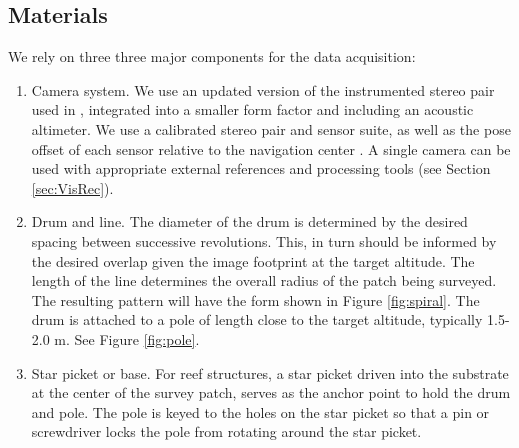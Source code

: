 
\subsection{Materials}
We rely on three three major components for the data acquisition:
\begin{enumerate}
\item Camera system. We use an updated version of the instrumented stereo pair used in \cite{Henderson_2013} \cite{Camilli_2007}, integrated into a smaller form factor and including an acoustic altimeter. We use a calibrated stereo pair and sensor suite, as well as the pose offset of each sensor relative to the navigation center \cite{Johnson_Roberson_2013} \cite{Mahon_2008}. A single camera can be used with appropriate external references and processing tools (see Section \ref{sec:VisRec}).
\item Drum and line. The diameter of the drum is determined by the desired spacing between successive revolutions. This, in turn should be informed by the desired overlap given the image footprint at the target altitude. The length of the line determines the overall radius of the patch being surveyed. The resulting pattern will have the form shown in Figure \ref{fig:spiral}. The drum is attached to a pole of length close to the target altitude, typically 1.5-2.0 m. See Figure \ref{fig:pole}.




\item Star picket or base. For reef structures, a star picket driven into the substrate at the center of the survey patch, serves as the anchor point to hold the drum and pole. The pole is keyed to the holes on the star picket so that a pin or screwdriver locks the pole from rotating around the star picket.

\end{enumerate}


  